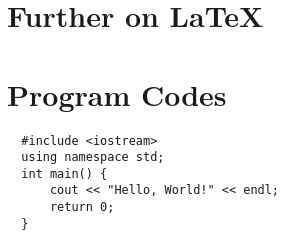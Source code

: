 \begin{appendices}
    \section{Further on \LaTeX}
    \section{Program Codes}
    \begin{verbatim}
  #include <iostream>
  using namespace std;
  int main() {
      cout << "Hello, World!" << endl;
      return 0;
  }
    \end{verbatim}
  \end{appendices}